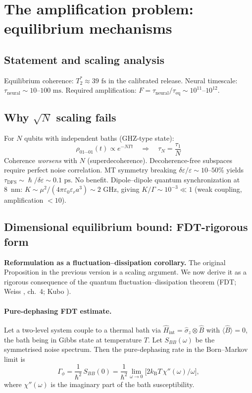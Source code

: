 \documentclass[twocolumn,10pt]{article}
\renewcommand{\hbar}{\hslash}
\newcommand{\kB}{k_{\text{B}}}
\newcommand{\ps}{\text{~ps}}
\newcommand{\fs}{\text{~fs}}
\newcommand{\DFS}{\text{DFS}}
\begin{document}
\section{The amplification problem: equilibrium mechanisms}
\subsection{Statement and scaling analysis}
Equilibrium coherence: $T_2^* \approx 39\fs$ in the calibrated release. Neural
timescale: $\tau_{\text{neural}} \sim 10\text{--}100\text{~ms}$. Required
amplification: $F = \tau_{\text{neural}}/\tau_{\text{eq}} \sim
10^{11}\text{--}10^{12}$.

\subsection{Why $\sqrt{N}$ scaling fails}
For $N$ qubits with independent baths (GHZ-type state):
\begin{equation}
\rho_{01\cdots01}(t) \propto e^{-N\Gamma t} \quad \Rightarrow \quad
\tau_N = \frac{\tau_1}{N}
\end{equation}
Coherence \textit{worsens} with $N$ (superdecoherence).
Decoherence-free subspaces require perfect noise correlation. MT symmetry
breaking $\delta\varepsilon/\varepsilon \sim 10\text{--}50\%$
\cite{Sept2003} yields $\tau_{\DFS} \sim \hbar/\delta\varepsilon
\sim 0.1\ps$. No benefit.
Dipole--dipole quantum synchronization at 8~nm:
$K \sim \mu^2/(4\pi\varepsilon_0\varepsilon_r a^3) \sim 2\text{~GHz}$,
giving $K/\Gamma \sim 10^{-3} \ll 1$ (weak coupling, amplification $<10$).

\subsection{Dimensional equilibrium bound: FDT-rigorous form}
\textbf{Reformulation as a fluctuation--dissipation corollary.}
The original Proposition in the previous version is a scaling argument.
We now derive it as a rigorous consequence of the quantum
fluctuation--dissipation theorem (FDT; Weiss \cite{Weiss2008}, ch.~4;
Kubo \cite{Kubo1966}).
\paragraph{Pure-dephasing FDT estimate.}
\label{lem:FDT}
Let a two-level system couple to a thermal bath via
$\hat{H}_{\text{int}}=\hat\sigma_z\otimes\hat{B}$ with
$\langle\hat B\rangle=0$, the bath being in Gibbs state at temperature
$T$. Let $S_{BB}(\omega)$ be the symmetrised noise spectrum. Then the
pure-dephasing rate in the Born--Markov limit is
\begin{equation}
\Gamma_\phi = \frac{1}{\hbar^2}\, S_{BB}(0)
= \frac{1}{\hbar^2}\lim_{\omega\to 0}
\bigl[2\kB T\, \chi''(\omega)/\omega\bigr],
\label{eq:FDT_pure_dephasing}
\end{equation}
where $\chi''(\omega)$ is the imaginary part of the bath susceptibility.
\end{document}
